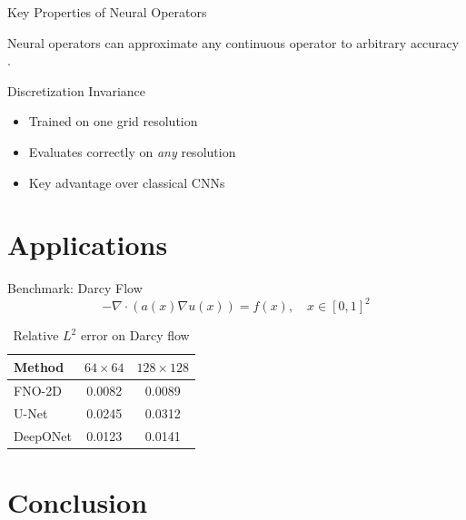 \documentclass[11pt]{beamer}
\begin{document}
\begin{frame}{Key Properties of Neural Operators}
    \begin{theorem}
        Neural operators can approximate any continuous operator to arbitrary accuracy
        \cite{kovachki2023neural}.
    \end{theorem}

    \pause

    \begin{block}{Discretization Invariance}
        \begin{itemize}
            \item Trained on one grid resolution
            \item Evaluates correctly on \emph{any} resolution
            \item Key advantage over classical CNNs
        \end{itemize}
    \end{block}
\end{frame}

\section{Applications}

\begin{frame}{Benchmark: Darcy Flow}
    \begin{equation}
        -\nabla \cdot (a(x) \nabla u(x)) = f(x), \quad x \in [0,1]^2
    \end{equation}

    \begin{table}
        \centering
        \caption{Relative $L^2$ error on Darcy flow}
        \begin{tabular}{@{}lcc@{}}
            \toprule
            Method    & $64\times64$ & $128\times128$ \\
            \midrule
            FNO-2D    & 0.0082 & 0.0089 \\
            U-Net     & 0.0245 & 0.0312 \\
            DeepONet  & 0.0123 & 0.0141 \\
            \bottomrule
        \end{tabular}
    \end{table}
\end{frame}

\section{Conclusion}
\end{document}
